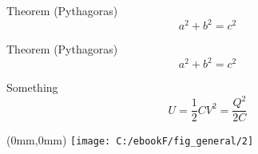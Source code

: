 \documentclass{report}
\begin{document}
  \begin{beamerlikethm}{Theorem (Pythagoras)}
\[ a^2 + b^2 = c^2 \]
\end{beamerlikethm}

\begin{beamerlikethm2}{Theorem (Pythagoras)}
\[ a^2 + b^2 = c^2 \]
\end{beamerlikethm2}



\begin{beamerlikethm2}{Something}
\lipsum[5]
\begin{equation}
U=\frac{1}{2}CV^{2}=\frac{Q^{2}}{2C}
\end{equation}
\end{beamerlikethm2}
\newpage


\newpage
\thispagestyle{empty}
\begin{textblock*}{\paperwidth}(0mm,0mm)
   \noindent\texttt{[image: C:/ebookF/fig\_general/2]}
\end{textblock*}
\mbox{}
\newpage
\end{document}
